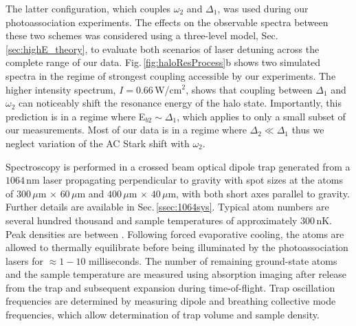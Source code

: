 The latter configuration, which couples $\omega_2$ and $\Delta_1$, was used during our photoassociation experiments.
The effects on the observable spectra between these two schemes was considered using a three-level model, Sec.\,\ref{sec:highE_theory}, to evaluate both scenarios of laser detuning across the complete range of our data.
Fig.\,\ref{fig:haloResProcess}b shows two simulated spectra in the regime of strongest coupling accessible by our experiments.
The higher intensity spectrum, $I=0.66$\,W/cm$^2$, shows that coupling between $\Delta_1$ and $\omega_2$ can noticeably shift the resonance energy of the halo state. 
Importantly, this prediction is in a regime where E$_{b2} \sim \Delta_1$, which applies to only a small subset of our measurements.
Most of our data is in a regime where $\Delta_2 \ll \Delta_1$ thus we neglect variation of the AC Stark shift with $\omega_2$.


Spectroscopy is performed in a crossed beam optical dipole trap generated from a $1064$\,nm laser propagating perpendicular to gravity with spot sizes at the atoms of $300\,\mu\text{m}\,\times\,60\,\mu\text{m}$ and $400\,\mu\text{m}\,\times\,40\,\mu\text{m}$, with both short axes parallel to gravity.
Further details are available in Sec.\,\ref{ssec:1064sys}.
Typical atom numbers are several hundred thousand and sample temperatures of approximately $300\,\text{nK}$.
Peak densities are between .
Following forced evaporative cooling, the atoms are allowed to thermally equilibrate before being illuminated by the photoassociation lasers for $\approx\!1 - 10$ milliseconds.
The number of remaining ground-state atoms and the sample temperature are measured using absorption imaging after release from the trap and subsequent expansion during time-of-flight.
Trap oscillation frequencies are determined by measuring dipole and breathing collective mode frequencies, which allow determination of trap volume and sample density.

